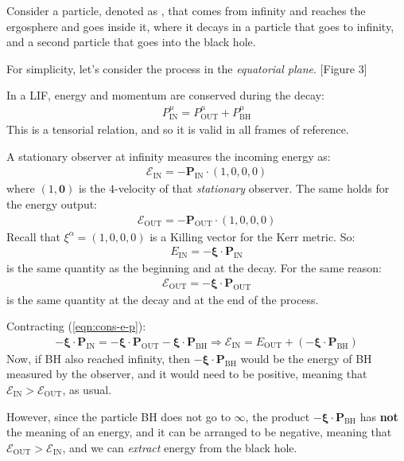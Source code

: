 \documentclass[../template.tex]{subfiles}
\begin{document}
Consider a particle, denoted as , that comes from infinity and reaches the ergosphere and goes inside it, where it decays in a particle  that goes to infinity, and a second particle  that goes into the black hole. 

For simplicity, let's consider the process in the \textit{equatorial plane}. [Figure 3]

In a LIF, energy and momentum are conserved during the decay:
\begin{align}\label{eqn:cons-e-p}
    P_{\mathrm{IN}}^\mu = P_{\mathrm{OUT}}^\mu + P_{\mathrm{BH}}^\mu
\end{align}
This is a tensorial relation, and so it is valid in all frames of reference.

A stationary observer at infinity measures the incoming energy as:
\begin{align*}
    \mathcal{E}_\mathrm{IN} = -\bm{P_{\mathrm{IN}}}\cdot(1,0,0,0)  
\end{align*}
where $(1,\bm{0})$ is the $4$-velocity of that \textit{stationary} observer. The same holds for the energy output:
\begin{align*}
    \mathcal{E}_{\mathrm{OUT}} = - \bm{P_{\mathrm{OUT}}} \cdot (1,0,0,0)
\end{align*}    
Recall that $\xi^\alpha = (1,0,0,0)$ is a Killing vector for the Kerr metric. So:
\begin{align*}
    E_{\mathrm{IN}}=-\bm{\xi}\cdot \bm{P_{\mathrm{IN}}}
\end{align*} 
is the same quantity as the beginning and at the decay. For the same reason:
\begin{align*}
    \mathcal{E}_{\mathrm{OUT} } = -\bm{\xi}\cdot \bm{P_{\mathrm{OUT} }}
\end{align*} 
is the same quantity at the decay and at the end of the process.

Contracting (\ref{eqn:cons-e-p}):
\begin{align*}
    -\bm{\xi}\cdot \bm{P_{\mathrm{IN} }} = - \bm{\xi} \cdot \bm{P_{\mathrm{OUT} }} - \bm{\xi}\cdot \bm{P_{\mathrm{BH} }} \Rightarrow \mathcal{E}_{\mathrm{IN} } = E_{\mathrm{OUT} } + (-\bm{\xi} \cdot \bm{P_\mathrm{BH}})
\end{align*}
Now, if BH also reached infinity, then $-\bm{\xi}\cdot \bm{P_\mathrm{BH} }$ would be the energy of BH measured by the observer, and it would need to be positive, meaning that $\mathcal{E}_{\mathrm{IN} } > \mathcal{E}_{\mathrm{OUT} }$, as usual. 

However, since the particle BH does not go to $\infty$, the product $-\bm{\xi} \cdot \bm{P_\mathrm{BH} }$ has \textbf{not} the meaning of an energy, and it can be arranged to be negative, meaning that $\mathcal{E}_{\mathrm{OUT} } > \mathcal{E}_{\mathrm{IN} }$, and we can \textit{extract} energy from the black hole.
\end{document}

